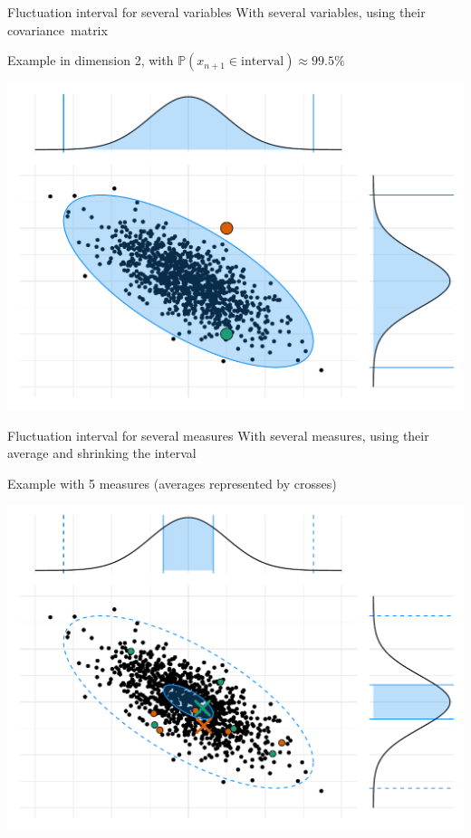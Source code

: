 \documentclass[10pt]{beamer}
\begin{document}
\begin{frame}{Fluctuation interval for several variables}
    With several variables, using their \alert{covariance~matrix}

    Example in dimension 2, with \(\mathbb{P}(x_{n+1} \in \text{interval}) \approx 99.5\%\)

    \begin{center}
        \includegraphics[width=0.8\linewidth]{img/experiment/non_regression/statistics/single_point.pdf}
    \end{center}
\end{frame}

\begin{frame}{Fluctuation interval for several measures}
    With several measures, using their \alert{average} and shrinking the interval

    Example with 5 measures (averages represented by crosses)

    \begin{center}
        \includegraphics[width=0.8\linewidth]{img/experiment/non_regression/statistics/several_points.pdf}
    \end{center}
\end{frame}
\end{document}
